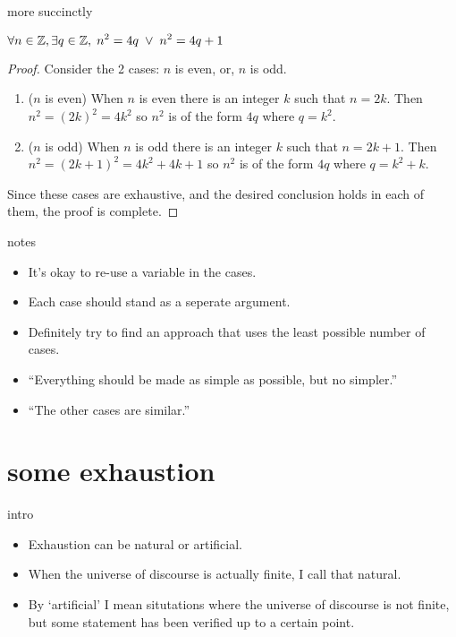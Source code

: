 \documentclass[landscape]{beamer}
\begin{document}
\begin{frame}{more succinctly}
\begin{thm*}
$\displaystyle \forall n \in {\mathbb Z}, \exists q \in {\mathbb Z}, \; n^2 = 4q \; \lor \; n^2 = 4q+1$
\end{thm*}
\pause
\begin{proof} 
Consider the 2 cases: $n$ is even, or, $n$ is odd.\pause
\begin{enumerate}
\item ($n$ is even) When $n$ is even there is an integer $k$ such that $n=2k$. Then $n^2=(2k)^2=4k^2$ so $n^2$ is of the form $4q$ where $q=k^2$. \pause
\item ($n$ is odd) When $n$ is odd there is an integer $k$ such that $n=2k+1$. Then $n^2=(2k+1)^2=4k^2+4k+1$ so $n^2$ is of the form $4q$ where $q=k^2+k$. \pause
\end{enumerate}
Since these cases are exhaustive, and the desired conclusion holds in each of them, the proof is complete.
\end{proof}
\end{frame}

\begin{frame}{notes}
\begin{itemize}
\item It's okay to re-use a variable in the cases. \pause
\item Each case should stand as a seperate argument. \pause
\item Definitely try to find an approach that uses the least possible number of cases. \pause
\item ``Everything should be made as simple as possible, but no simpler.'' \pause
\item ``The other cases are similar.''
\end{itemize}
\end{frame}


\section{some exhaustion}

\begin{frame}{intro}
\begin{itemize}
\item Exhaustion can be natural or artificial. \pause
\item When the universe of discourse is actually finite, I call that natural. \pause
\item By `artificial' I mean situtations where the universe of discourse is not finite, but some statement has been 
verified up to a certain point. \pause
\end{itemize}
\end{frame}
\end{document}
